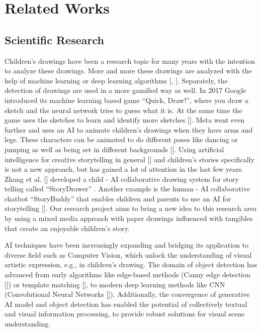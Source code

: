 \section{Related Works}


\subsection{Scientific Research}
Children's drawings have been a research topic for many years with the intention to analyze these drawings. More and more these drawings are analyzed with the help of machine learning or deep learning algorithms [\cite{1}, \cite{2}]. Separately, the detection of drawings are used in a more gamified way as well. In 2017 Google introduced its machine learning based game “Quick, Draw!”, where you draw a sketch and the neural network tries to guess what it is. At the same time the game uses the sketches to learn and identify more sketches [\cite{3}]. Meta went even further and uses an AI to animate children’s drawings when they have arms and legs. These characters can be animated to do different poses like dancing or jumping as well as being set in different backgrounds [\cite{4}]. 
Using artificial intelligence for creative storytelling in general [\cite{5}] and children's stories specifically is not a new approach, but has gained a lot of attention in the last few years. Zhang et al. [\cite{6}] developed a child - AI collaborative drawing system for story telling called “StoryDrawer” . Another example is the human - AI collaborative chatbot “StoryBuddy” that enables children and parents to use an AI for storytelling [\cite{7}]. Our research project aims to bring a new idea to this research area by using a mixed media approach with paper drawings influenced with tangibles that create an enjoyable children's story. \par

AI techniques have been increasingly expanding and bridging its application to diverse field such as Computer Vision, which unlock the understanding of visual artistic expression, e.g., in children’s drawing. The domain of object detection has advanced from early algorithms like edge-based methods (Canny edge detection [\cite{9}]) or template matching [\cite{8}], to modern deep learning methods like CNN (Convolutional Neural Networks [\cite{10}]). Additionally, the convergence of generative AI model and object detection has enabled the potential of collectively textual and visual information processing, to provide robust solutions for visual scene understanding.
